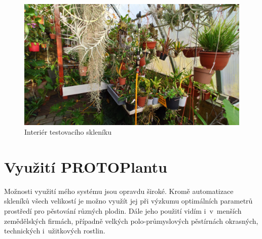 \begin{figure}[htbp]
    \centering
    \includegraphics[width=\textwidth]{img/PHOTOS/OrchidHouse_INTERIOR.jpg}
    \caption{Interiér testovacího skleníku}
    \label{fig:OrchidHouse_INTERIORs}
\end{figure}

\section{Využití PROTOPlantu}
Možnosti využití mého systému jsou opravdu široké.
Kromě automatizace skleníků všech velikostí je možno využít jej při výzkumu optimálních parametrů prostředí pro pěstování různých plodin.
Dále jeho použití vidím i~v~menších zemědělských firmách, případně velkých polo-průmyslových pěs\-tír\-nách okrasných, technických i~užitkových rostlin. 

\newpage